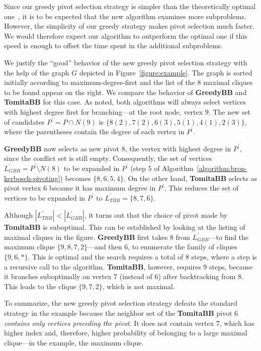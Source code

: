 \documentclass[final,1p]{elsarticle-modified}
\newcommand{\alg}[1]{\textbf{#1}}
\begin{document}
Since our greedy pivot selection strategy is simpler than the theoretically optimal one~\cite{tomita-2006}, it is to be expected that the new algorithm examines more subproblems. However, the simplicity of our greedy strategy makes pivot selection much faster. We would therefore expect our algorithm to outperform the optimal one if this speed is enough to offset the time spent in the additional subproblems.

We justify the ``good'' behavior of the new greedy pivot selection strategy with the help of the graph $G$ depicted in Figure~\ref{figure:example}. The graph is sorted initially according to maximum-degree-first and the list of the $8$ maximal cliques to be found appear on the right. We compare the behavior of \alg{GreedyBB} and \alg{TomitaBB} for this case. As noted, both algorithms will always select vertices with highest degree first for branching---at the root node, vertex $9$. The new set of candidates $P^\prime = P\cap N(9)$ is $\{8(2),7(2),6(3),5(1),4(1),2(3)\}$, where the parentheses contain the degree of each vertex in $P^\prime$.

\alg{GreedyBB} now selects as new pivot $8$, the vertex with highest degree in $P^\prime$, since the conflict set is still empty. Consequently, the set of vertices $L^\prime_{GBB}=P^\prime\setminus N(8)$ to be expanded in $P^\prime$ (step 5 of Algorithm~\ref{algorithm:bron-kerbosch-pivoting}) becomes $\{8,6,5,4\}$. On the other hand, \alg{TomitaBB} selects as pivot vertex $6$ because it has maximum degree in $P^\prime$. This reduces the set of vertices to be expanded in $P^\prime$ to $L^\prime_{TBB}=\{8,7,6\}$.

Although $|L^\prime_{TBB}|<|L^\prime_{GBB}|$, it turns out that the choice of pivot made by \alg{TomitaBB} is suboptimal. This can be established by looking at the listing of maximal cliques in the figure. \alg{GreedyBB} first takes $8$ from $L^\prime_{GBB}$---to find the maximum clique $\{9,8,7,2\}$---and then $6$, to enumerate the family of cliques $\{9,6,*\}$. This is optimal and the search requires a total of $8$ steps, where a step is a recursive call to the algorithm. \alg{TomitaBB}, however, requires $9$ steps, because it branches suboptimally on vertex $7$ (instead of $6$) after backtracking from $8$. This leads to the clique $\{9,7,2\}$, which is not maximal.

To summarize, the new greedy pivot selection strategy defeats the standard strategy in the example because the neighbor set of the \alg{TomitaBB} pivot $6$ \emph{contains only vertices preceding the pivot}. It does not contain vertex $7$, which has higher index and, therefore, higher probability of belonging to a large maximal clique---in the example, the maximum clique.
\end{document}
